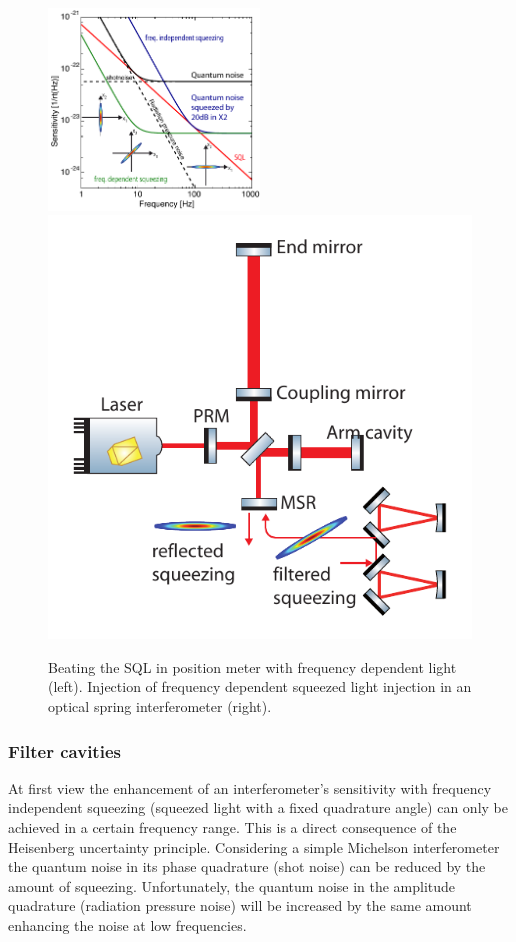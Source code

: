 \FloatBarrier
\begin{figure}[H]
\includegraphics[width =0.5\textwidth]{./Sec_Optics/MI_SQL_AI.pdf}
\hspace{35pt}
\includegraphics[scale=0.8]{./Sec_Optics/FilterMI-Ill_v2.pdf}
\caption[Illustration of frequency dependent and independent squeezed light injection]{Beating the SQL in position meter with frequency dependent light (left). Injection of frequency dependent squeezed light injection in an optical spring interferometer (right).} \label{fig:FilterMI-Ill}
\end{figure}
\subsubsection{Filter cavities}\label{sec:filtercavities}
At first view the enhancement of an interferometer's sensitivity with frequency independent squeezing (squeezed light with a fixed quadrature angle) can only be achieved in a certain frequency range. This is a direct consequence of the Heisenberg uncertainty principle. Considering a simple Michelson interferometer the quantum noise in its phase quadrature (shot noise) can be reduced by the amount of squeezing. Unfortunately, the quantum noise in the amplitude quadrature (radiation pressure noise) will be increased by the same amount enhancing the noise at low frequencies.
 
